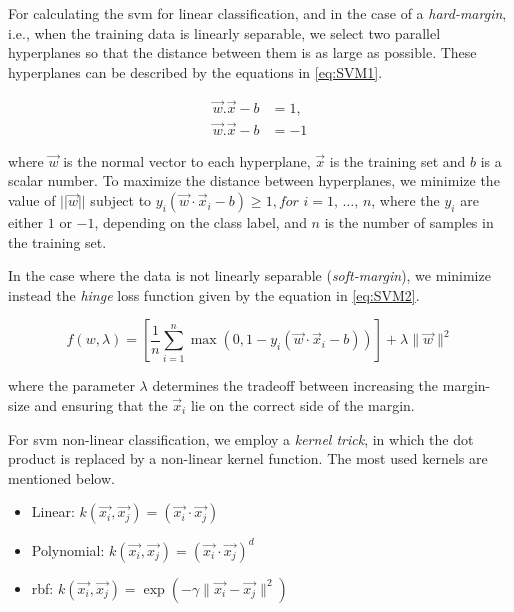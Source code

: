 For calculating the \ac{svm} for linear classification, and in the case of a \textit{hard-margin}, i.e., when the training data is linearly separable, we select two parallel hyperplanes so that the distance between them is as large as possible.
These hyperplanes can be described by the equations in \ref{eq:SVM1}.

\begin{equation}
\label{eq:SVM1}
\begin{split}
\vec{w}.\vec{x}-b&=1, \\
\vec{w}.\vec{x}-b&=-1
\end{split}
\end{equation}

where $\vec{w}$ is the normal vector to each hyperplane, $\vec{x}$ is the training set and $b$ is a scalar number.
To maximize the distance between hyperplanes, we minimize the value of $||\vec{w}||$ subject to ${\displaystyle y_{i}({\vec {w}}\cdot {\vec {x}}_{i}-b)\geq 1,} for$ ${\displaystyle i=1,\,\ldots ,\,n} $, where the $y_{i}$ are either $1$ or $-1$, depending on the class label, and $n$ is the number of samples in the training set.

In the case where the data is not linearly separable (\textit{soft-margin}), we minimize instead the \textit{hinge} loss function given by the equation in \ref{eq:SVM2}.

\begin{equation}
\label{eq:SVM2}
f(w,\lambda)={\displaystyle \left[{\frac {1}{n}}\sum _{i=1}^{n}\max \left(0,1-y_{i}({\vec {w}}\cdot {\vec {x}}_{i}-b)\right)\right]+\lambda \lVert {\vec {w}}\rVert ^{2}}
\end{equation}

where the parameter $\lambda$ determines the tradeoff between increasing the margin-size and ensuring that the ${\vec {x}}_{i}$ lie on the correct side of the margin.

For \ac{svm} non-linear classification, we employ a \textit{kernel trick}, in which the dot product is replaced by a non-linear kernel function. The most used kernels are mentioned below.

\begin{itemize}
    
    \item Linear: ${\displaystyle k({\vec {x_{i}}},{\vec {x_{j}}})=({\vec {x_{i}}}\cdot {\vec {x_{j}}})}$

    \item Polynomial: ${\displaystyle k({\vec {x_{i}}},{\vec {x_{j}}})=({\vec {x_{i}}}\cdot {\vec {x_{j}}})^{d}}$

    \item \ac{rbf}: ${\displaystyle k({\vec {x_{i}}},{\vec {x_{j}}})=\exp(-\gamma \|{\vec {x_{i}}}-{\vec {x_{j}}}\|^{2})}$
\end{itemize}


